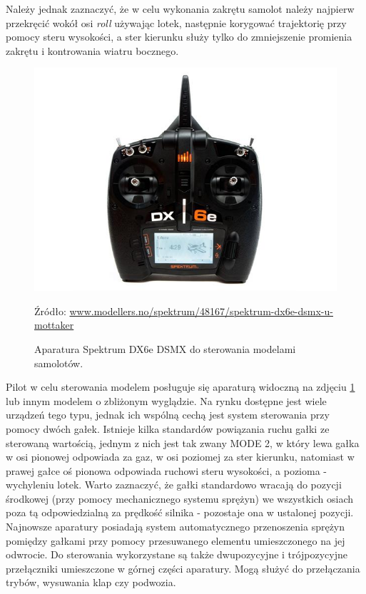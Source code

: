 \documentclass[12pt, a4paper]{article}
\begin{document}
Należy jednak zaznaczyć, że w celu wykonania zakrętu samolot należy najpierw przekręcić wokół osi \textit{roll} używając lotek, następnie korygować trajektorię przy pomocy steru wysokości, a ster kierunku służy tylko do zmniejszenie promienia zakrętu i kontrowania wiatru bocznego.

\begin{figure}[ht]
    \centering
    \includegraphics[width=1\textwidth]{dx6e}
    \caption{Aparatura Spektrum DX6e DSMX do sterowania modelami samolotów.}
    \small Źródło: \url{www.modellers.no/spektrum/48167/spektrum-dx6e-dsmx-u-mottaker}
    \label{fig:dx6e}
\end{figure}

Pilot w celu sterowania modelem posługuje się aparaturą widoczną na zdjęciu \ref{fig:dx6e} lub innym modelem o zbliżonym wyglądzie. Na rynku dostępne jest wiele urządzeń tego typu, jednak ich wspólną cechą jest system sterowania przy pomocy dwóch gałek. Istnieje kilka standardów powiązania ruchu gałki ze sterowaną wartością, jednym z nich jest tak zwany MODE 2, w który lewa gałka w osi pionowej odpowiada za gaz, w osi poziomej za ster kierunku, natomiast w prawej gałce oś pionowa odpowiada ruchowi steru wysokości, a pozioma - wychyleniu lotek. Warto zaznaczyć, że gałki standardowo wracają do pozycji środkowej (przy pomocy mechanicznego systemu sprężyn) we wszystkich osiach poza tą odpowiedzialną za prędkość silnika - pozostaje ona w ustalonej pozycji. Najnowsze aparatury posiadają system automatycznego przenoszenia sprężyn pomiędzy gałkami przy pomocy przesuwanego elementu umieszczonego na jej odwrocie. Do sterowania wykorzystane są także dwupozycyjne i trójpozycyjne przełączniki umieszczone w górnej części aparatury. Mogą służyć do przełączania trybów, wysuwania klap czy podwozia.
\end{document}
